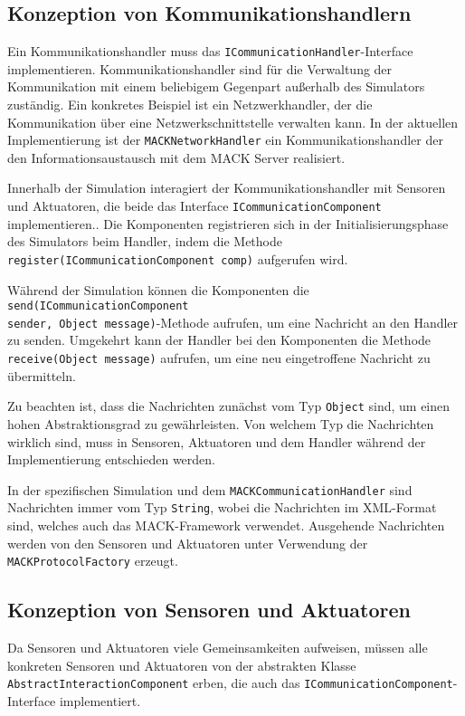 \subsection{Konzeption von Kommunikationshandlern}\label{subsec:concept_communication}
Ein Kommunikationshandler muss das \texttt{ICommunicationHandler}-Interface implementieren. Kommunikationshandler sind für die Verwaltung der Kommunikation mit einem beliebigem Gegenpart außerhalb des Simulators zuständig. Ein konkretes Beispiel ist ein Netzwerkhandler, der die Kommunikation über eine Netzwerkschnittstelle verwalten kann. In der aktuellen Implementierung ist der \texttt{MACKNetworkHandler} ein Kommunikationshandler der den Informationsaustausch mit dem MACK Server realisiert.

Innerhalb der Simulation interagiert der Kommunikationshandler mit Sensoren und Aktuatoren, die beide das Interface \texttt{ICommunicationComponent} implementieren.. Die Komponenten registrieren sich in der Initialisierungsphase des Simulators beim Handler, indem die Methode \texttt{register\-(ICommunication\-Component comp)} aufgerufen wird.

Während der Simulation können die Komponenten die \texttt{send(ICommunication\-Component\\
sender, Object message)}-Methode aufrufen, um eine Nachricht an den Handler zu senden. Umgekehrt kann der Handler bei den Komponenten die Methode \texttt{receive(Object message)} aufrufen, um eine neu eingetroffene Nachricht zu übermitteln.

Zu beachten ist, dass die Nachrichten zunächst vom Typ \texttt{Object} sind, um einen hohen Abstraktionsgrad zu gewährleisten. Von welchem Typ die Nachrichten wirklich sind, muss in Sensoren, Aktuatoren und dem Handler während der Implementierung entschieden werden.

In der spezifischen Simulation und dem \texttt{MACKCommunicationHandler} sind Nachrichten immer vom Typ \texttt{String}, wobei die Nachrichten im XML-Format sind, welches auch das MACK-Framework verwendet. Ausgehende Nachrichten werden von den Sensoren und Aktuatoren unter Verwendung der \texttt{MACKProtocolFactory} erzeugt.


\subsection{Konzeption von Sensoren und Aktuatoren}\label{subsec:concept_actuators_sensors}
Da Sensoren und Aktuatoren viele Gemeinsamkeiten aufweisen, müssen alle konkreten Sensoren und Aktuatoren von der abstrakten Klasse \texttt{AbstractInteractionComponent} erben, die auch das \texttt{ICommunication\-Component}-Interface implementiert.

